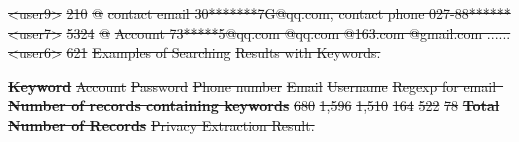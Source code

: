\documentclass[conference]{IEEEtran}
\providecommand{\DIFdeltex}[1]{{\protect\color{red}\sout{#1}}}                      %
\providecommand{\DIFdelFL}[1]{\DIFdel{#1}} %
\providecommand{\DIFdel}[1]{\texorpdfstring{\DIFdeltex{#1}}{}} %
\begin{document}
\DIFdelFL{\textless{}user9\textgreater{} }%
\DIFdelFL{210                                    }%
\DIFdelFL{@                                 }%
\DIFdelFL{contact email 30*******7G@qq.com, contact phone 027-88******                               }%
\DIFdelFL{\textless{}user7\textgreater{} }%
\DIFdelFL{5324                                   }%
\DIFdelFL{@                                 }%
\DIFdelFL{Account 73*****5@qq.com @qq.com @163.com @gmail.com 	......      }%
\DIFdelFL{\textless{}user6\textgreater{} }%
\DIFdelFL{621                                    }%
{%
\DIFdelFL{Examples of Searching }%
\DIFdelFL{Results with Keywords.}}

\textbf{\DIFdelFL{Keyword}}                               %
\DIFdelFL{Account }%
\DIFdelFL{Password }%
\DIFdelFL{Phone number }%
\DIFdelFL{Email }%
\DIFdelFL{Username }%
\DIFdelFL{Regexp for email~  }%
\textbf{\DIFdelFL{Number of records containing keywords}} %
\DIFdelFL{680     }%
\DIFdelFL{1,596     }%
\DIFdelFL{1,510         }%
\DIFdelFL{164   }%
\DIFdelFL{522      }%
\DIFdelFL{78                 }%
\textbf{\DIFdelFL{Total Number of Records}} %
{%
\DIFdelFL{Privacy Extraction Result.}}
\end{document}
